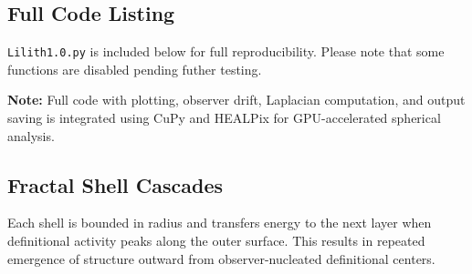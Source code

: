 \subsection{Full Code Listing}
\texttt{Lilith1.0.py} is included below for full reproducibility. Please note that some functions are disabled pending futher testing. 






\textbf{Note:} Full code with plotting, observer drift, Laplacian computation, and output saving is integrated using CuPy and HEALPix for GPU-accelerated spherical analysis.

\subsection{Fractal Shell Cascades}
Each shell is bounded in radius and transfers energy to the next layer when definitional activity peaks along the outer surface. This results in repeated emergence of structure outward from observer-nucleated definitional centers.
